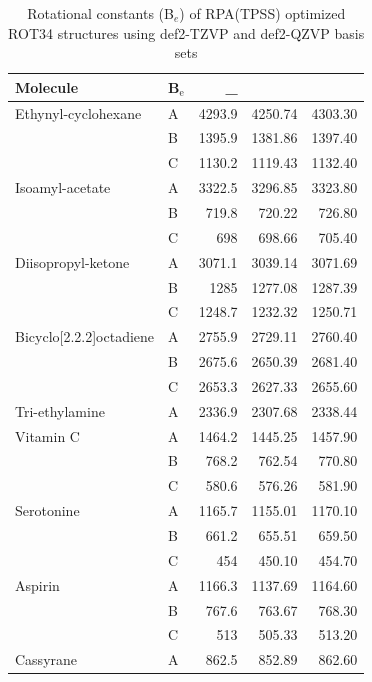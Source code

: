 \documentclass[journal=jctcce,manuscript=article]{achemso}
\begin{document}
\begin{spacing}{1}
\begin{longtable}{llRRR}
  \caption{Rotational constants (B$_e$) of RPA(TPSS) optimized ROT34
    structures\cite{C3CP52293H,Risthaus14JComputChem35p1509}
    using def2-TZVP\cite{Weigend05PhysChemChemPhys7p3297}
    and def2-QZVP\cite{Weigend03JChemPhys119p12753} basis sets} \\
    \hline
    Molecule & B$_{\text{e}}$  & _{} &  &  \\
    \hline
    Ethynyl-cyclohexane & A     & 4293.9 & 4250.74 & 4303.30 \\
          & B     & 1395.9 & 1381.86 & 1397.40 \\
          & C     & 1130.2 & 1119.43 & 1132.40 \\
    Isoamyl-acetate & A     & 3322.5 & 3296.85 & 3323.80 \\
          & B     & 719.8 & 720.22 & 726.80 \\
          & C     & 698   & 698.66 & 705.40 \\
    Diisopropyl-ketone & A     & 3071.1 & 3039.14 & 3071.69 \\
          & B     & 1285  & 1277.08 & 1287.39 \\
          & C     & 1248.7 & 1232.32 & 1250.71 \\
    Bicyclo[2.2.2]octadiene & A     & 2755.9 & 2729.11 & 2760.40 \\
          & B     & 2675.6 & 2650.39 & 2681.40 \\
          & C     & 2653.3 & 2627.33 & 2655.60 \\
    Tri-ethylamine & A     & 2336.9 & 2307.68 & 2338.44 \\
    Vitamin C & A     & 1464.2 & 1445.25 & 1457.90 \\
          & B     & 768.2 & 762.54 & 770.80 \\
          & C     & 580.6 & 576.26 & 581.90 \\
    Serotonine & A     & 1165.7 & 1155.01 & 1170.10 \\
          & B     & 661.2 & 655.51 & 659.50 \\
          & C     & 454   & 450.10 & 454.70 \\
    Aspirin & A     & 1166.3 & 1137.69 & 1164.60 \\
          & B     & 767.6 & 763.67 & 768.30 \\
          & C     & 513   & 505.33 & 513.20 \\
    Cassyrane & A     & 862.5 & 852.89 & 862.60 \\

\end{longtable}
\end{spacing}
\end{document}
